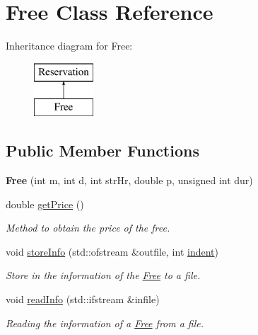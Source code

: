 \hypertarget{class_free}{}\section{Free Class Reference}
\label{class_free}
Inheritance diagram for Free\+:\begin{figure}[H]
\begin{center}
\leavevmode
\includegraphics[height=2.000000cm]{class_free}
\end{center}
\end{figure}
\subsection*{Public Member Functions}
\begin{DoxyCompactItemize}
\item 
\mbox{\label{class_free_add02897be555344a947ad860ab73e679}} 
{\bfseries Free} (int m, int d, int str\+Hr, double p, unsigned int dur)
\item 
double \mbox{\hyperlink{class_free_a229f009a7535eeba0a6ff4495de8c6bf}{get\+Price}} ()
\begin{DoxyCompactList}\small\item\em Method to obtain the price of the free. \end{DoxyCompactList}\item 
void \mbox{\hyperlink{class_free_a5eec9da16ebf4f388d16dd270bd93b64}{store\+Info}} (std\+::ofstream \&outfile, int \mbox{\hyperlink{class_reservation_a480981ed050bae19bc74bbb0bbb459f9}{indent}})
\begin{DoxyCompactList}\small\item\em Store in the information of the \mbox{\hyperlink{class_free}{Free}} to a file. \end{DoxyCompactList}\item 
void \mbox{\hyperlink{class_free_ad1023c825c9790edf0797e2e69dd2fcf}{read\+Info}} (std\+::ifstream \&infile)
\begin{DoxyCompactList}\small\item\em Reading the information of a \mbox{\hyperlink{class_free}{Free}} from a file. \end{DoxyCompactList}\end{DoxyCompactItemize}
